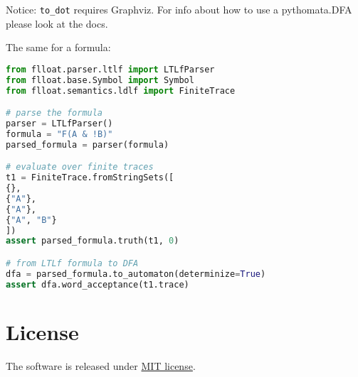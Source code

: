Notice: \texttt{to\_dot} requires Graphviz. For info about how to use a pythomata.DFA please look at the docs.

The same for a \LTLf formula:

\begin{lstlisting}[language=Python, style=Python]
from flloat.parser.ltlf import LTLfParser
from flloat.base.Symbol import Symbol
from flloat.semantics.ldlf import FiniteTrace

# parse the formula
parser = LTLfParser()
formula = "F(A & !B)"
parsed_formula = parser(formula)

# evaluate over finite traces
t1 = FiniteTrace.fromStringSets([
{},
{"A"},
{"A"},
{"A", "B"}
])
assert parsed_formula.truth(t1, 0)

# from LTLf formula to DFA
dfa = parsed_formula.to_automaton(determinize=True)
assert dfa.word_acceptance(t1.trace)
\end{lstlisting}
 
\section{License}
The software is released under \href{https://github.com/MarcoFavorito/flloat/blob/master/LICENSE}{MIT license}.